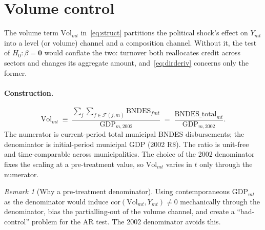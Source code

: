 \documentclass{article}
\newcommand{\Vol}{\mathrm{Vol}}
\newcommand{\cF}{\mathcal{F}}
\newcommand{\bzero}{\mathbf{0}}
\theoremstyle{plain}
\theoremstyle{definition}
\theoremstyle{remark}
\newtheorem{remark}{Remark}
\begin{document}
\section{Volume control}\label{sec:vol}

The volume term $\Vol_{mt}$ in~\eqref{eq:struct} partitions the political
shock's effect on $Y_{mt}$ into a level (or volume) channel and a composition
channel. Without it, the test of $H_0:\beta=\bzero$ would conflate the two:
turnover both reallocates credit across sectors and changes its aggregate
amount, and~\eqref{eq:dirderiv} concerns only the former.

\paragraph{Construction.}
\begin{equation}\label{eq:vol-explicit}
  \Vol_{mt} \;\equiv\;
  \frac{\sum_{j}\sum_{f\in\cF(j,m)}\mathrm{BNDES}_{fmt}}{\mathrm{GDP}_{m,2002}}
  \;=\;
  \frac{\mathrm{BNDES\_total}_{mt}}{\mathrm{GDP}_{m,2002}}.
\end{equation}
The numerator is current-period total municipal BNDES disbursements; the
denominator is initial-period municipal GDP (2002 R\$). The ratio is unit-free
and time-comparable across municipalities. The choice of the 2002 denominator
fixes the scaling at a pre-treatment value, so $\Vol_{mt}$ varies in $t$ only
through the numerator.

\begin{remark}[Why a pre-treatment denominator]
Using contemporaneous $\mathrm{GDP}_{mt}$ as the denominator would induce
$\mathrm{cor}(\Vol_{mt},Y_{mt})\neq 0$ mechanically through the
denominator, bias the partialling-out of the volume channel, and create a
``bad-control'' problem for the AR test. The 2002 denominator avoids this.
\end{remark}
\end{document}
